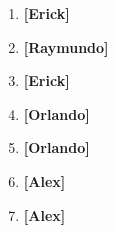 \documentclass[10pt,letterpaper,fleqn]{article}
\begin{document}
\begin{enumerate}
        \item \textbf{[Erick]}

        \item \textbf{[Raymundo]}
        
        \item \textbf{[Erick]}
        
        \item \textbf{[Orlando]}  
        
        \item \textbf{[Orlando]}
        
        \item \textbf{[Alex]}

        \item \textbf{[Alex]}                                      
    \end{enumerate}
        
\end{document}
